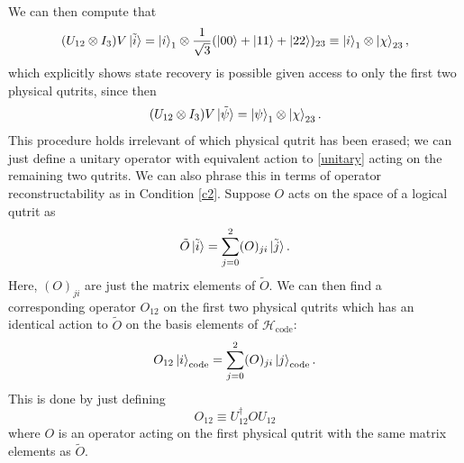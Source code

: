 \documentclass[12pt,a4paper]{report}
\numberwithin{equation}{section}
\newcommand{\Hcode}{\mathcal{H}_{\text{code}}}
\theoremstyle{definition}
\theoremstyle{theorem}
\theoremstyle{theorem}
\theoremstyle{example}
\theoremstyle{definition}
\begin{document}
We can then compute that
\begin{equation}
	(U_{12}\otimes I_{3})V\ket{\tilde{i}}=\ket{i}_{1}\otimes\frac{1}{\sqrt{3}}(\ket{{00}}+\ket{{11}}+\ket{{22}})_{23}\equiv\ket{{i}}_{1}\otimes\ket{\chi}_{23},
\end{equation}
which explicitly shows state recovery is possible given access to only the first two physical qutrits, since then
\begin{equation}\label{staterec}
	(U_{12}\otimes I_{3})V\ket{\tilde{\psi}}=\ket{{\psi}}_{1}\otimes\ket{\chi}_{23}.
\end{equation}
This procedure holds irrelevant of which physical qutrit has been erased; we can just define a unitary operator with equivalent action to \ref{unitary} acting on the remaining two qutrits. We can also phrase this in terms of operator reconstructability as in Condition \ref{c2}. Suppose ${O}$ acts on the space of a logical qutrit as
\begin{equation}
	\tilde{O}\ket{\tilde{i}}=\sum_{j=0}^{2}(O)_{ji}\ket{\tilde{j}}.
\end{equation}
Here, $(O)_{ji}$ are just the matrix elements of $\tilde{O}$. We can then find a corresponding operator $O_{12}$ on the first two physical qutrits which has an identical action to $\tilde{O}$ on the basis elements of $\Hcode$:
\begin{equation}
	O_{12}\ket{i}_{\text{code}}=\sum_{j=0}^{2}(O)_{ji}\ket{j}_{\text{code}}.
\end{equation}
This is done by just defining
\begin{equation}
	O_{12}\equiv U_{12}^{\dagger}OU_{12}
\end{equation}
where $O$ is an operator acting on the first physical qutrit with the same matrix elements as $\tilde{O}$.
\end{document}
